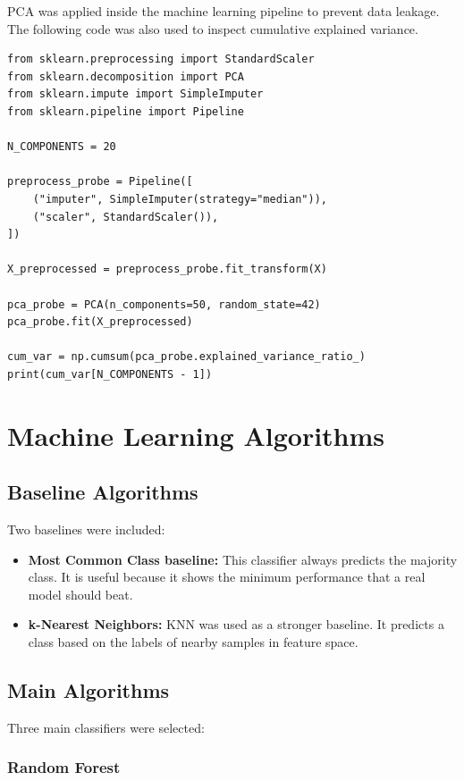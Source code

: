 \documentclass[12pt,a4paper]{article}
\begin{document}
PCA was applied inside the machine learning pipeline to prevent data leakage. The following code was also used to inspect cumulative explained variance.

\begin{lstlisting}
from sklearn.preprocessing import StandardScaler
from sklearn.decomposition import PCA
from sklearn.impute import SimpleImputer
from sklearn.pipeline import Pipeline

N_COMPONENTS = 20

preprocess_probe = Pipeline([
    ("imputer", SimpleImputer(strategy="median")),
    ("scaler", StandardScaler()),
])

X_preprocessed = preprocess_probe.fit_transform(X)

pca_probe = PCA(n_components=50, random_state=42)
pca_probe.fit(X_preprocessed)

cum_var = np.cumsum(pca_probe.explained_variance_ratio_)
print(cum_var[N_COMPONENTS - 1])
\end{lstlisting}

\section{Machine Learning Algorithms}

\subsection{Baseline Algorithms}

Two baselines were included:

\begin{itemize}
    \item \textbf{Most Common Class baseline:} This classifier always predicts the majority class. It is useful because it shows the minimum performance that a real model should beat.
    \item \textbf{k-Nearest Neighbors:} KNN was used as a stronger baseline. It predicts a class based on the labels of nearby samples in feature space.
\end{itemize}

\subsection{Main Algorithms}

Three main classifiers were selected:

\subsubsection{Random Forest}
\end{document}
